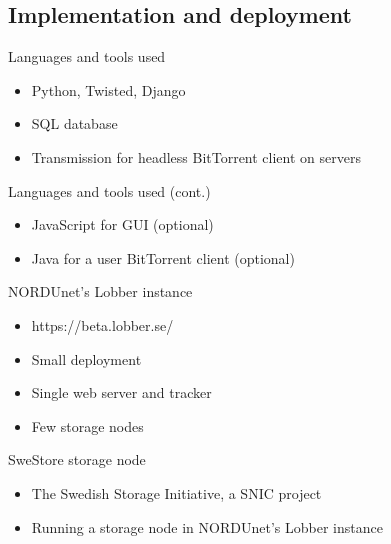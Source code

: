 \documentclass{beamer}
\begin{document}
\subsection{Implementation and deployment}
\begin{frame}{Languages and tools used}
  \begin{itemize}
  \item
    Python, Twisted, Django
  \item
    SQL database
  \item
    Transmission for headless BitTorrent client on servers
  \end{itemize}
\end{frame}

\begin{frame}{Languages and tools used (cont.)}
  \begin{itemize}
  \item
    JavaScript for GUI (optional)
  \item
    Java for a user BitTorrent client (optional)
  \end{itemize}
\end{frame}

\begin{frame}{NORDUnet's Lobber instance}
  \begin{itemize}
  \item
    https://beta.lobber.se/
  \item
    Small deployment
  \item
    Single web server and tracker
  \item
    Few storage nodes
  \end{itemize}
\end{frame}

\begin{frame}{SweStore storage node}
  \begin{itemize}
  \item
    The Swedish Storage Initiative, a SNIC project
  \item
    Running a storage node in NORDUnet's Lobber instance
  \end{itemize}
\end{frame}
\end{document}
